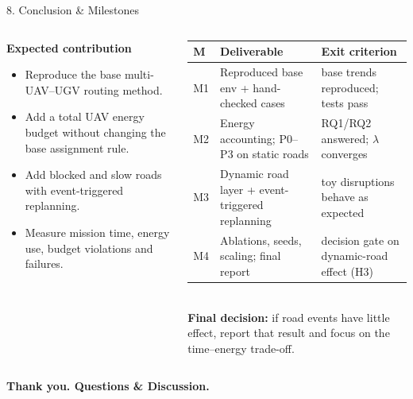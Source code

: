 \documentclass[aspectratio=169,10pt]{beamer}
\begin{document}
\begin{frame}{8. Conclusion \& Milestones}
\small
\begin{columns}[T]
\begin{column}{0.44\textwidth}
\textbf{Expected contribution}
\begin{itemize}
  \item Reproduce the base multi-UAV--UGV routing method.
  \item Add a total UAV energy budget without changing the base assignment rule.
  \item Add blocked and slow roads with event-triggered replanning.
  \item Measure mission time, energy use, budget violations and failures.
\end{itemize}
\end{column}
\begin{column}{0.53\textwidth}
\scriptsize
\renewcommand{\arraystretch}{1.25}
\begin{tabular}{P{0.6cm}P{3.1cm}P{3.0cm}}
\toprule
\textbf{M} & \textbf{Deliverable} & \textbf{Exit criterion}\\
\midrule
M1 & Reproduced base env + hand-checked cases & base trends reproduced; tests pass\\
M2 & Energy accounting; P0--P3 on static roads & RQ1/RQ2 answered; $\lambda$ converges\\
M3 & Dynamic road layer + event-triggered replanning & toy disruptions behave as expected\\
M4 & Ablations, seeds, scaling; final report & decision gate on dynamic-road effect (H3)\\
\bottomrule
\end{tabular}\\[2mm]
\small
\textbf{Final decision:} if road events have little effect, report that result and focus on the time--energy trade-off.
\end{column}
\end{columns}
\vspace{4mm}
\centering
\textbf{Thank you. Questions \& Discussion.}
\end{frame}
\end{document}
